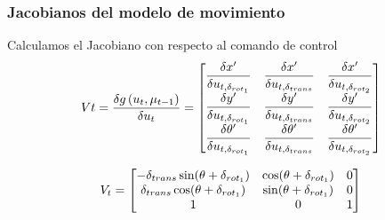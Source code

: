 \begin{frame}
    \frametitle{Jacobianos del modelo de movimiento}
    
    Calculamos el Jacobiano con respecto al comando de control
    \begin{equation*}
        V{t} = \dfrac{\delta g\left( u_{t},\mu_{t-1} \right)}{\delta u_{t}} =
        \begin{bmatrix}
            \dfrac{\delta x^{\prime}}{\delta u_{t,\delta_{rot_{1}}}} & \dfrac{\delta x^{\prime}}{\delta u_{t,\delta_{trans}}} & \dfrac{\delta x^{\prime}}{\delta u_{t,\delta_{rot_{2}}}}\\
            \dfrac{\delta y^{\prime}}{\delta u_{t,\delta_{rot_{1}}}} & \dfrac{\delta y^{\prime}}{\delta u_{t,\delta_{trans}}} & \dfrac{\delta y^{\prime}}{\delta u_{t,\delta_{rot_{2}}}}\\
            \dfrac{\delta \theta^{\prime}}{\delta u_{t,\delta_{rot_{1}}}} & \dfrac{\delta \theta^{\prime}}{\delta u_{t,\delta_{trans}}} & \dfrac{\delta \theta^{\prime}}{\delta u_{t,\delta_{rot_{2}}}}
        \end{bmatrix}
    \end{equation*}
    
    \begin{equation*}
        V_{t} = 
        \begin{bmatrix}
            -\delta_{trans} \sin(\theta + \delta_{rot_{1}}) & \cos(\theta + \delta_{rot_{1}}) & 0\\
            \delta_{trans} \cos(\theta + \delta_{rot_{1}}) & \sin(\theta + \delta_{rot_{1}}) & 0\\
            1 & 0 & 1\\
        \end{bmatrix}
    \end{equation*}
\end{frame}

